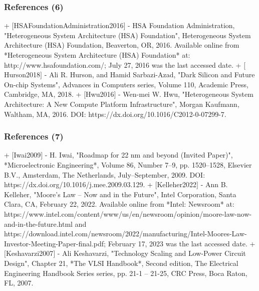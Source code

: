 \documentclass[xcolor={usenames,dvipsnames},hyperref={hyperindex,bookmarks}]{beamer}
\begin{document}
\begin{frame}
	\frametitle{References (6)}



+ $[$HSAFoundationAdministration2016$]$
	- {HSA Foundation Administration}, "Heterogeneous System Architecture (HSA) Foundation", Heterogeneous System Architecture (HSA) Foundation, Beaverton, {OR}, 2016. Available online from *Heterogeneous System Architecture (HSA) Foundation* at: http://www.hsafoundation.com/; July 27, 2016 was the last accessed date.
+ $[$Hurson2018$]$
	- Ali R. Hurson, and Hamid {Sarbazi-Azad}, "Dark Silicon and Future On-chip Systems", Advances in Computers series, Volume 110, Academic Press, Cambridge, {MA}, 2018.
+ $[$Hwu2016$]$
	- {Wen-mei} W. Hwu, "Heterogeneous System Architecture: A New Compute Platform Infrastructure", Morgan Kaufmann, Waltham, {MA}, 2016. DOI: https://dx.doi.org/10.1016/C2012-0-07299-7.


\end{frame}
















\begin{frame}
	\frametitle{References (7)}


+ $[$Iwai2009$]$
	- H. Iwai, "Roadmap for 22 nm and beyond (Invited Paper)", *Microelectronic Engineering*, Volume 86, Number 7--9, pp. 1520--1528, Elsevier {B.V.}, Amsterdam, {The Netherlands}, July--September, 2009. DOI: https://dx.doi.org/10.1016/j.mee.2009.03.129.
+ $[$Kelleher2022$]$
	- Ann B. Kelleher, "Moore's Law -- Now and in the Future", Intel Corporation, Santa Clara, {CA}, February 22, 2022. Available online from *Intel: Newsroom* at: https://www.intel.com/content/www/us/en/newsroom/opinion/moore-law-now-and-in-the-future.html and https://download.intel.com/newsroom/2022/manufacturing/Intel-Moores-Law-Investor-Meeting-Paper-final.pdf; February 17, 2023 was the last accessed date.
+ $[$Keshavarzi2007$]$
	- Ali Keshavarzi, "Technology Scaling and Low-Power Circuit Design", Chapter 21, *The {VLSI} Handbook*, Second edition, The Electrical Engineering Handbook Series series, pp. 21-1 -- 21-25, {CRC} Press, Boca Raton, {FL}, 2007.




\end{frame}
\end{document}
